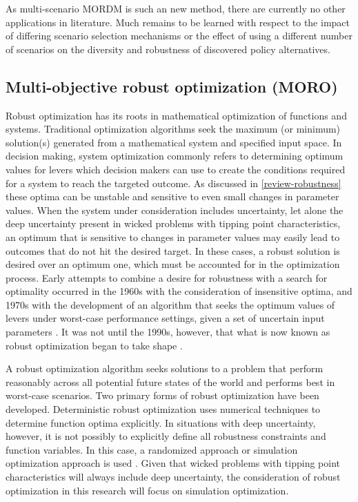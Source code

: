    As multi-scenario MORDM is such an new method, there are currently no other applications in literature. Much remains to be learned with respect to the impact of differing scenario selection mechanisms or the effect of using a different number of scenarios on the diversity and robustness of discovered policy alternatives.

    \subsection{Multi-objective robust optimization (MORO)}
    Robust optimization has its roots in mathematical optimization of functions and systems. Traditional optimization algorithms seek the maximum (or minimum) solution(s) generated from a mathematical system and specified input space. In decision making, system optimization commonly refers to determining optimum values for levers which decision makers can use to create the conditions required for a system to reach the targeted outcome. As discussed in \cref{review-robustness} these optima can be unstable and sensitive to even small changes in parameter values. When the system under consideration includes uncertainty, let alone the deep uncertainty present in wicked problems with tipping point characteristics, an optimum that is sensitive to changes in parameter values may easily lead to outcomes that do not hit the desired target. In these cases, a robust solution is desired over an optimum one, which must be accounted for in the optimization process. Early attempts to combine a desire for robustness with a search for optimality occurred in the 1960s \citep{Dorato1966} with the consideration of insensitive optima, and 1970s with the development of an algorithm that seeks the optimum values of levers under worst-case performance settings, given a set of uncertain input parameters \citep{Soyster1973}. It was not until the 1990s, however, that what is now known as robust optimization began to take shape \citep{Sozuer2016}. 
    
    A robust optimization algorithm seeks solutions to a problem that perform reasonably across all potential future states of the world and performs best in worst-case scenarios. Two primary forms of robust optimization have been developed. Deterministic robust optimization uses numerical techniques to determine function optima explicitly. In situations with deep uncertainty, however, it is not possibly to explicitly define all robustness constraints and function variables. In this case, a randomized approach or simulation optimization approach is used \citep{Beyer2007}. Given that wicked problems with tipping point characteristics will always include deep uncertainty, the consideration of robust optimization in this research will focus on simulation optimization.
    
